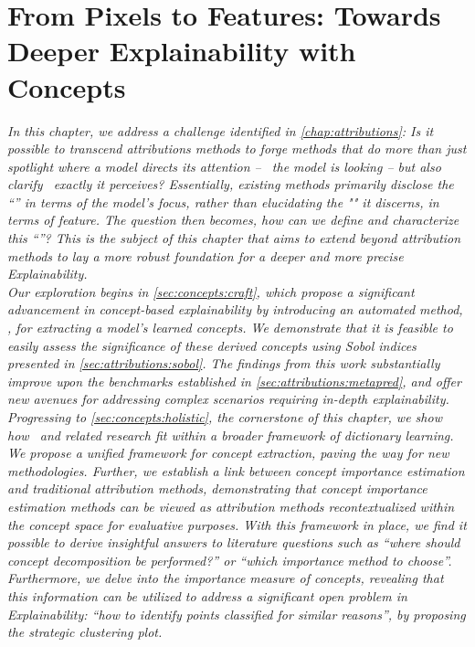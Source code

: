 \chapter{From Pixels to Features: Towards Deeper Explainability with Concepts}
\label{chap:concepts}

\begin{chapterabstract}
\textit{
In this chapter, we address a challenge identified in \autoref{chap:attributions}: Is it possible to transcend attributions methods to forge methods that do more than just spotlight where a model directs its attention -- \where~the model is looking -- but also clarify \what~exactly it perceives? Essentially, existing methods primarily disclose the ``\where'' in terms of the model's focus, rather than elucidating the "\what" it discerns, in terms of feature. The question then becomes, how can we define and characterize this ``\what''? This is the subject of this chapter that aims to extend beyond attribution methods to lay a more robust foundation for a deeper and more precise Explainability. \\
Our exploration begins in \autoref{sec:concepts:craft}, which propose a significant advancement in concept-based explainability by introducing an automated method, \craft, for extracting a model's learned concepts. We demonstrate that it is feasible to easily assess the significance of these derived concepts using Sobol indices presented in \autoref{sec:attributions:sobol}. The findings from this work substantially improve upon the benchmarks established in \autoref{sec:attributions:metapred}, and offer new avenues for addressing complex scenarios requiring in-depth explainability.
Progressing to \autoref{sec:concepts:holistic}, the cornerstone of this chapter, we show  how \craft~and related research fit within a broader framework of dictionary learning. We propose a unified framework for concept extraction, paving the way for new methodologies. Further,  we establish a link between concept importance estimation and traditional attribution methods, demonstrating that concept importance estimation methods can be viewed as attribution methods recontextualized within the concept space for evaluative purposes.
With this framework in place, we find it possible to derive insightful answers to literature questions such as ``where should concept decomposition be performed?'' or ``which importance method to choose''. Furthermore, we delve into the importance measure of concepts, revealing that this information can be utilized to address a significant open problem in Explainability: ``how to identify points classified for similar reasons'', by proposing the strategic clustering plot.
}
\end{chapterabstract}
